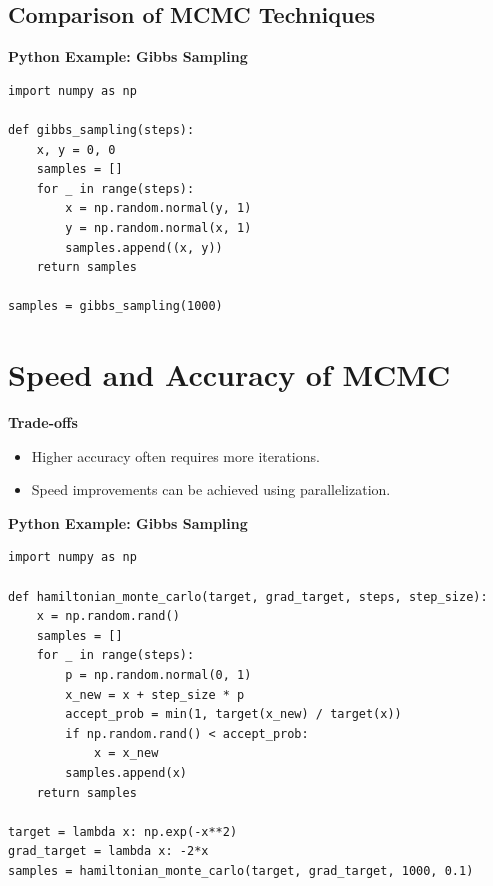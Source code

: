 \documentclass[12pt,a4paper]{article}
\begin{document}
\subsection{Comparison of MCMC Techniques}

\textbf{Python Example: Gibbs Sampling}
\begin{verbatim}
import numpy as np

def gibbs_sampling(steps):
    x, y = 0, 0
    samples = []
    for _ in range(steps):
        x = np.random.normal(y, 1)
        y = np.random.normal(x, 1)
        samples.append((x, y))
    return samples

samples = gibbs_sampling(1000)
\end{verbatim}

\section{Speed and Accuracy of MCMC}
\textbf{Trade-offs}
\begin{itemize}
    \item Higher accuracy often requires more iterations.
    \item Speed improvements can be achieved using parallelization.
\end{itemize}

\textbf{Python Example: Gibbs Sampling}
\begin{verbatim}
import numpy as np

def hamiltonian_monte_carlo(target, grad_target, steps, step_size):
    x = np.random.rand()
    samples = []
    for _ in range(steps):
        p = np.random.normal(0, 1)
        x_new = x + step_size * p
        accept_prob = min(1, target(x_new) / target(x))
        if np.random.rand() < accept_prob:
            x = x_new
        samples.append(x)
    return samples

target = lambda x: np.exp(-x**2)
grad_target = lambda x: -2*x
samples = hamiltonian_monte_carlo(target, grad_target, 1000, 0.1)
\end{verbatim}
\end{document}
